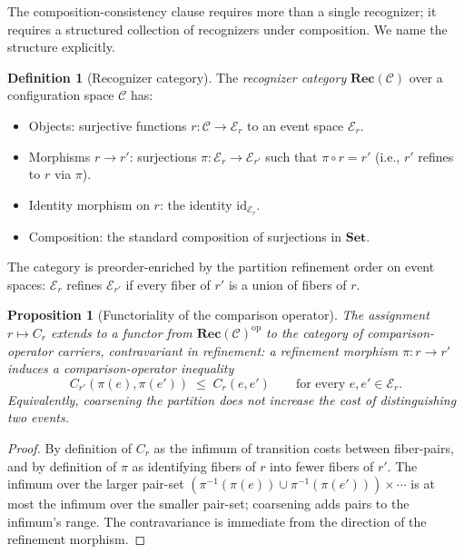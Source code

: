 \documentclass[11pt,a4paper]{article}
\newtheorem{proposition}[theorem]{Proposition}
\theoremstyle{definition}
\newtheorem{definition}[theorem]{Definition}
\theoremstyle{remark}
\begin{document}
The composition-consistency clause requires more than a single
recognizer; it requires a structured collection of recognizers under
composition. We name the structure explicitly.

\begin{definition}[Recognizer category]
\label{def:rec-cat}
The \emph{recognizer category} $\mathbf{Rec}(\mathcal{C})$ over a
configuration space $\mathcal{C}$ has:
\begin{itemize}[leftmargin=1.6em]
\item Objects: surjective functions $r : \mathcal{C} \to \mathcal{E}_r$
to an event space $\mathcal{E}_r$.
\item Morphisms $r \to r'$: surjections $\pi : \mathcal{E}_r \to
\mathcal{E}_{r'}$ such that $\pi \circ r = r'$ (i.e., $r'$ refines
to $r$ via $\pi$).
\item Identity morphism on $r$: the identity $\mathrm{id}_{\mathcal{E}_r}$.
\item Composition: the standard composition of surjections in
$\mathbf{Set}$.
\end{itemize}
The category is preorder-enriched by the partition refinement order
on event spaces: $\mathcal{E}_r$ refines $\mathcal{E}_{r'}$ if every
fiber of $r'$ is a union of fibers of $r$.
\end{definition}

\begin{proposition}[Functoriality of the comparison operator]
\label{prop:functoriality}
The assignment $r \mapsto C_r$ extends to a functor from
$\mathbf{Rec}(\mathcal{C})^{\mathrm{op}}$ to the category of
comparison-operator carriers, contravariant in refinement: a
refinement morphism $\pi : r \to r'$ induces a comparison-operator
inequality
\[
C_{r'}(\pi(e), \pi(e'))
\;\le\; C_r(e, e')
\qquad \text{for every } e, e' \in \mathcal{E}_r.
\]
Equivalently, coarsening the partition does not increase the cost
of distinguishing two events.
\end{proposition}

\begin{proof}
By definition of $C_r$ as the infimum of transition costs between
fiber-pairs, and by definition of $\pi$ as identifying fibers of $r$
into fewer fibers of $r'$. The infimum over the larger pair-set
$(\pi^{-1}(\pi(e)) \cup \pi^{-1}(\pi(e'))) \times \cdots$ is at
most the infimum over the smaller pair-set; coarsening adds pairs
to the infimum's range. The contravariance is immediate from the
direction of the refinement morphism.
\end{proof}
\end{document}
